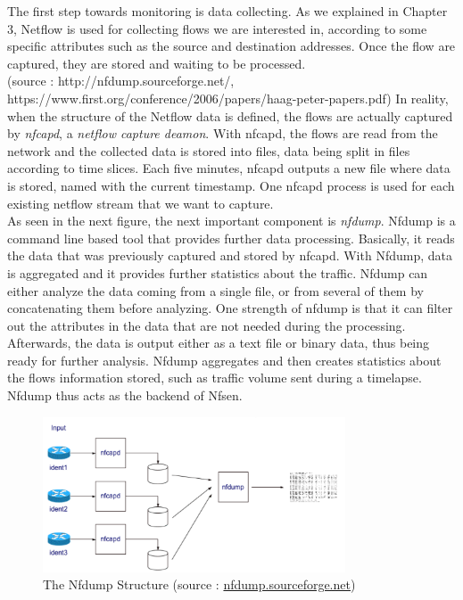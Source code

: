 The first step towards monitoring is data collecting. As we explained in Chapter 3, Netflow is used for collecting flows we are interested in, according to some specific attributes such as the source and destination addresses. Once the flow are captured, they are stored and waiting to be processed. \\

(source : http://nfdump.sourceforge.net/, https://www.first.org/conference/2006/papers/haag-peter-papers.pdf)
In reality, when the structure of the Netflow data is defined, the flows are actually captured by \textit{nfcapd}, a \textit{netflow capture deamon}. With nfcapd, the flows are read from the network and the collected data is stored into files, data being split in files according to time slices. Each five minutes, nfcapd outputs a new file where data is stored, named with the current timestamp. One nfcapd process is used for each existing netflow stream that we want to capture.\\

As seen in the next figure, the next important component is \textit{nfdump}. Nfdump is a command line based tool that provides further data processing. Basically, it reads the data that was previously captured and stored by nfcapd. With Nfdump, data is aggregated and it provides further statistics about the traffic. Nfdump can either analyze the data coming from a single file, or from several of them by concatenating them before analyzing. One strength of nfdump is that it can filter out the attributes in the data that are not needed during the processing. Afterwards, the data is output either as a text file or binary data, thus being ready for further analysis. Nfdump aggregates and then creates statistics about the flows information stored, such as traffic volume sent during a timelapse. Nfdump thus acts as the backend of Nfsen.\\

\begin{figure}[!h]
	\centering
	\includegraphics[width=0.8\textwidth]{res/nfdump.png}
	\caption{The Nfdump Structure (source : \url{nfdump.sourceforge.net})}
	\label{fig:nfdump}
\end{figure}

